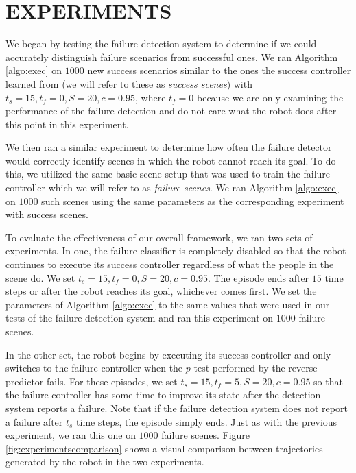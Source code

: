 \documentclass[letterpaper, 10 pt, conference]{ieeeconf}  %
\begin{document}
\section{EXPERIMENTS}\label{sec:experiments}
	We began by testing the failure detection system to determine if we could accurately distinguish failure scenarios from successful ones. We ran Algorithm \ref{algo:exec} on $1000$ new success scenarios similar to the ones the success controller learned from (we will refer to these as \textit{success scenes}) with $t_s=15, t_f=0, S=20, c=0.95$, where $t_f=0$ because we are only examining the performance of the failure detection and do not care what the robot does after this point in this experiment. 
	
	We then ran a similar experiment to determine how often the failure detector would correctly identify scenes in which the robot cannot reach its goal. To do this, we utilized the same basic scene setup that was used to train the failure controller which we will refer to as \textit{failure scenes}. We ran Algorithm \ref{algo:exec} on $1000$ such scenes using the same parameters as the corresponding experiment with success scenes.

	To evaluate the effectiveness of our overall framework, we ran two sets of experiments. In one, the failure classifier is completely disabled so that the robot continues to execute its success controller regardless of what the people in the scene do. We set $t_s=15, t_f=0, S=20, c=0.95$. The episode ends after $15$ time steps or after the robot reaches its goal, whichever comes first. We set the parameters of Algorithm \ref{algo:exec} to the same values that were used in our tests of the failure detection system and ran this experiment on $1000$ failure scenes.
	
	In the other set, the robot begins by executing its success controller and only switches to the failure controller when the $p$-test performed by the reverse predictor fails. For these episodes, we set $t_s=15, t_f=5, S=20, c=0.95$ so that the failure controller has some time to improve its state after the detection system reports a failure. Note that if the failure detection system does not report a failure after $t_s$ time steps, the episode simply ends. Just as with the previous experiment, we ran this one on $1000$ failure scenes. Figure \ref{fig:experimentscomparison} shows a visual comparison between trajectories generated by the robot in the two experiments.
	
\end{document}
